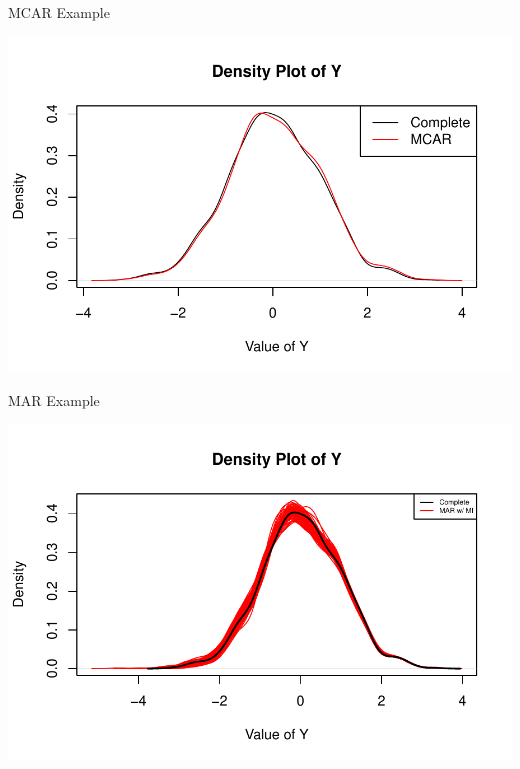\documentclass{beamer}
\begin{document}
\begin{frame}[allowframebreaks]{MCAR Example}
  



\includegraphics{sweaveFiles/lecture3-004}

\end{frame}


\begin{frame}[allowframebreaks]{MAR Example}
  



\includegraphics{sweaveFiles/lecture3-006}

\end{frame}
\end{document}
